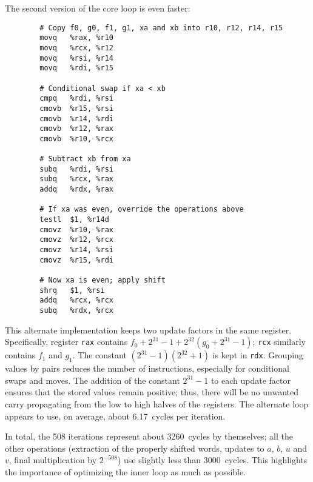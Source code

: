 \documentclass{llncs}
\begin{document}
The second version of the core loop is even faster:
\begin{verbatim}
        # Copy f0, g0, f1, g1, xa and xb into r10, r12, r14, r15
        movq   %rax, %r10
        movq   %rcx, %r12
        movq   %rsi, %r14
        movq   %rdi, %r15

        # Conditional swap if xa < xb
        cmpq   %rdi, %rsi
        cmovb  %r15, %rsi
        cmovb  %r14, %rdi
        cmovb  %r12, %rax
        cmovb  %r10, %rcx

        # Subtract xb from xa
        subq   %rdi, %rsi
        subq   %rcx, %rax
        addq   %rdx, %rax

        # If xa was even, override the operations above
        testl  $1, %r14d
        cmovz  %r10, %rax
        cmovz  %r12, %rcx
        cmovz  %r14, %rsi
        cmovz  %r15, %rdi

        # Now xa is even; apply shift
        shrq   $1, %rsi
        addq   %rcx, %rcx
        subq   %rdx, %rcx
\end{verbatim}
This alternate implementation keeps two update factors in the same
register. Specifically, register \verb+rax+ contains $f_0 + 2^{31} - 1 +
2^{32} (g_0 + 2^{31} - 1)$; \verb+rcx+ similarly contains $f_1$ and
$g_1$. The constant $(2^{31} - 1)(2^{32} + 1)$ is kept in \verb+rdx+.
Grouping values by pairs reduces the number of instructions, especially
for conditional swaps and moves. The addition of the constant $2^{31}-1$
to each update factor ensures that the stored values remain positive;
thus, there will be no unwanted carry propagating from the low to high
halves of the registers. The alternate loop appears to use, on average,
about 6.17~cycles per iteration.

In total, the 508 iterations represent about 3260~cycles by themselves;
all the other operations (extraction of the properly shifted words,
updates to $a$, $b$, $u$ and $v$, final multiplication by $2^{-508}$)
use slightly less than 3000~cycles. This highlights the importance of
optimizing the inner loop as much as possible.
\end{document}
